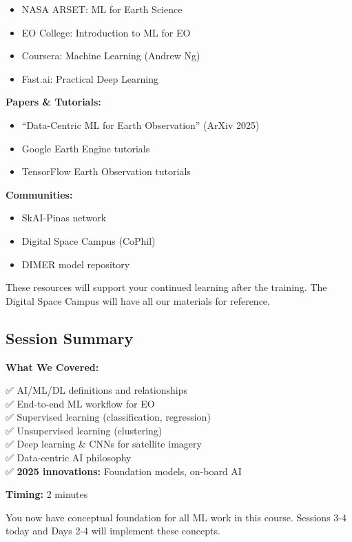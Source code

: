 \documentclass[
  letterpaper,
  DIV=11,
  numbers=noendperiod]{scrartcl}
\providecommand{\tightlist}{%
  \setlength{\itemsep}{0pt}\setlength{\parskip}{0pt}}
\begin{document}
\begin{itemize}
\tightlist
\item
  NASA ARSET: ML for Earth Science
\item
  EO College: Introduction to ML for EO
\item
  Coursera: Machine Learning (Andrew Ng)
\item
  Fast.ai: Practical Deep Learning
\end{itemize}

\textbf{Papers \& Tutorials:}

\begin{itemize}
\tightlist
\item
  ``Data-Centric ML for Earth Observation'' (ArXiv 2025)
\item
  Google Earth Engine tutorials
\item
  TensorFlow Earth Observation tutorials
\end{itemize}

\textbf{Communities:}

\begin{itemize}
\tightlist
\item
  SkAI-Pinas network
\item
  Digital Space Campus (CoPhil)
\item
  DIMER model repository
\end{itemize}

These resources will support your continued learning after the training.
The Digital Space Campus will have all our materials for reference.

\subsection{Session Summary}\label{session-summary}

\textbf{What We Covered:}

✅ AI/ML/DL definitions and relationships\\
✅ End-to-end ML workflow for EO\\
✅ Supervised learning (classification, regression)\\
✅ Unsupervised learning (clustering)\\
✅ Deep learning \& CNNs for satellite imagery\\
✅ Data-centric AI philosophy\\
✅ \textbf{2025 innovations:} Foundation models, on-board AI

\textbf{Timing:} 2 minutes

You now have conceptual foundation for all ML work in this course.
Sessions 3-4 today and Days 2-4 will implement these concepts.
\end{document}
